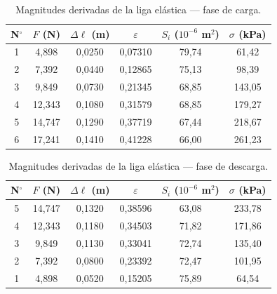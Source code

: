 \begin{table}[H]
    \centering
    \caption{Magnitudes derivadas de la liga elástica — fase de carga.}
    \label{tab:deriv_liga_carga}
    \begin{tabular}{cccccc}
        \toprule
        \textbf{N$^{\circ}$}
            & \textbf{$F$ (N)}
            & \textbf{$\Delta\ell$ (m)}
            & \textbf{$\varepsilon$}
            & \textbf{$S_i$ ($10^{-6}$ m$^2$)}
            & \textbf{$\sigma$ (kPa)} \\
        \midrule
        1 &  4{,}898 & 0{,}0250 & 0{,}07310 & 79{,}74 &  61{,}42 \\
        2 &  7{,}392 & 0{,}0440 & 0{,}12865 & 75{,}13 &  98{,}39 \\
        3 &  9{,}849 & 0{,}0730 & 0{,}21345 & 68{,}85 & 143{,}05 \\
        4 & 12{,}343 & 0{,}1080 & 0{,}31579 & 68{,}85 & 179{,}27 \\
        5 & 14{,}747 & 0{,}1290 & 0{,}37719 & 67{,}44 & 218{,}67 \\
        6 & 17{,}241 & 0{,}1410 & 0{,}41228 & 66{,}00 & 261{,}23 \\
        \bottomrule
    \end{tabular}
\end{table}

\begin{table}[H]
    \centering
    \caption{Magnitudes derivadas de la liga elástica — fase de descarga.}
    \label{tab:deriv_liga_descarga}
    \begin{tabular}{cccccc}
        \toprule
        \textbf{N$^{\circ}$}
            & \textbf{$F$ (N)}
            & \textbf{$\Delta\ell$ (m)}
            & \textbf{$\varepsilon$}
            & \textbf{$S_i$ ($10^{-6}$ m$^2$)}
            & \textbf{$\sigma$ (kPa)} \\
        \midrule
        5 & 14{,}747 & 0{,}1320 & 0{,}38596 & 63{,}08 & 233{,}78 \\
        4 & 12{,}343 & 0{,}1180 & 0{,}34503 & 71{,}82 & 171{,}86 \\
        3 &  9{,}849 & 0{,}1130 & 0{,}33041 & 72{,}74 & 135{,}40 \\
        2 &  7{,}392 & 0{,}0800 & 0{,}23392 & 72{,}47 & 101{,}95 \\
        1 &  4{,}898 & 0{,}0520 & 0{,}15205 & 75{,}89 &  64{,}54 \\
        \bottomrule
    \end{tabular}
\end{table}

